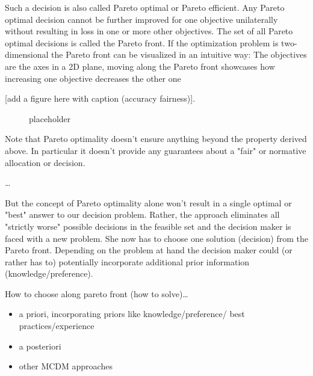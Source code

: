	Such a decision is also called Pareto optimal or Pareto efficient.
	Any Pareto optimal decision cannot be further improved for one objective unilaterally without resulting in loss in one or more other objectives.
	The set of all Pareto optimal decisions is called the Pareto front.
	If the optimization problem is two-dimensional the Pareto front can be visualized in an intuitive way:
	The objectives are the axes in a 2D plane, moving along the Pareto front showcases how increasing one objective decreases the other one

	[add a figure here with caption (accuracy fairness)].
	\begin{figure}
	\begin{center}
			
	\caption{placeholder}
	\end{center}
	\end{figure}

	Note that Pareto optimality doesn't ensure anything beyond the property derived above.
	In particular it doesn't provide any guarantees about a "fair" or normative allocation or decision.

	\dots

	But the concept of Pareto optimality alone won't result in a single optimal or "best" answer to our decision problem.
	Rather, the approach eliminates all "strictly worse" possible decisions in the feasible set and the decision maker is faced with a new problem.
	She now has to choose one solution (decision) from the Pareto front.
	Depending on the problem at hand the decision maker could (or rather has to) potentially incorporate additional prior information (knowledge/preference).

	How to choose along pareto front (how to solve)\dots

	\begin{itemize}
	\item a priori, incorporating priors like knowledge/preference/ 
	best practices/experience
	\item a posteriori
	\item other MCDM approaches
	\end{itemize}



